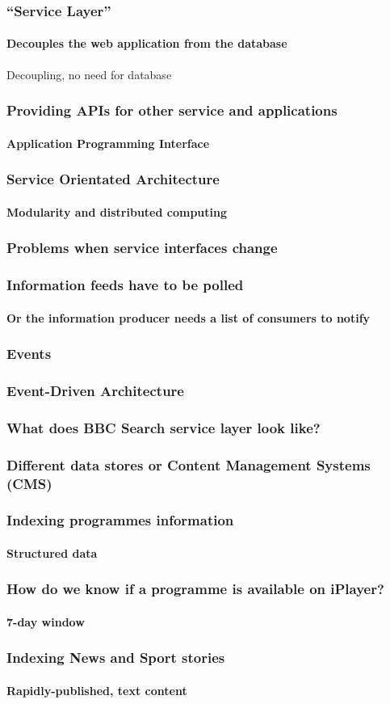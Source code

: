 \documentclass{beamer}
\begin{document}
\begin{frame}
  \frametitle{``Service Layer''}
  \framesubtitle{Decouples the web application from the database}
  Decoupling, no need for database
\end{frame}

\begin{frame}
  \frametitle{Providing APIs for other service and applications}
  \framesubtitle{Application Programming Interface}
\end{frame}

\begin{frame}
  \frametitle{Service Orientated Architecture}
  \framesubtitle{Modularity and distributed computing}
\end{frame}

\begin{frame}
  \frametitle{Problems when service interfaces change}
\end{frame}

\begin{frame}
  \frametitle{Information feeds have to be polled}
  \framesubtitle{Or the information producer needs a list of consumers to notify}
\end{frame}

\begin{frame}
  \frametitle{Events}
\end{frame}

\begin{frame}
  \frametitle{Event-Driven Architecture}
\end{frame}

\begin{frame}
  \frametitle{What does BBC Search service layer look like?}
\end{frame}

\begin{frame}
  \frametitle{Different data stores or Content Management Systems (CMS)}
\end{frame}

\begin{frame}
  \frametitle{Indexing programmes information}
  \framesubtitle{Structured data}
\end{frame}

\begin{frame}
  \frametitle{How do we know if a programme is available on iPlayer?}
  \framesubtitle{7-day window}
\end{frame}

\begin{frame}
  \frametitle{Indexing News and Sport stories}
  \framesubtitle{Rapidly-published, text content}
\end{frame}
\end{document}
